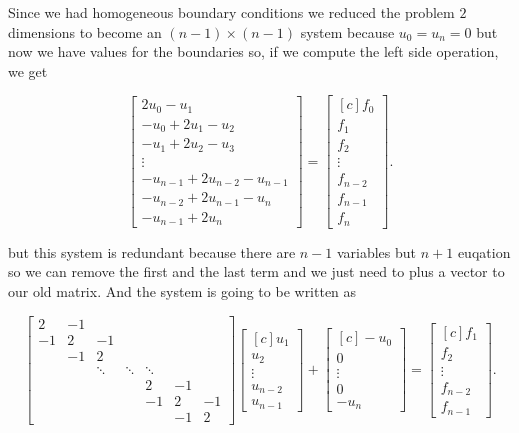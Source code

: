 \documentclass[fontsize=11pt,paper=a4,titlepage]{report}
\begin{document}
Since we had homogeneous boundary conditions we reduced the problem $2$ 
dimensions to become an $(n - 1) \times (n - 1)$ system because $u_0 = u_n = 0$ 
but now we have values for the boundaries so, if we compute the left side 
operation, we get

\begin{displaymath}
\begin{bmatrix}
	2u_0 - u_1 \\
	- u_0 + 2u_1 - u_2 \\
	- u_1 + 2u_2 - u_3 \\
	\vdots \\
	- u_{n - 1} + 2u_{n - 2} - u_{n - 1} \\
	- u_{n - 2} + 2u_{n - 1} - u_{n} \\
	- u_{n - 1} + 2u_n
\end{bmatrix}
=
\begin{bmatrix*}[c]
	f_0 \\
	f_1 \\
	f_2 \\
	\vdots \\
	f_{n - 2} \\
	f_{n - 1} \\
	f_n
\end{bmatrix*}.
\end{displaymath}

but this system is redundant because there are $n - 1$ variables but $n + 1$ 
euqation so we can remove the first and the last term and we just need to plus a
vector to our old matrix. And the system is going to be written as

\begin{displaymath}
\begin{bmatrix}
	2 & -1 &  &  &  &  &  \\
	-1 & 2 & -1 &  &  &  &  \\
	 & -1 & 2 &  &  &  &  \\
	 &  & \ddots & \ddots & \ddots &  & \\
	 &  &  &  & 2 & -1 &  \\
	 &  &  &  & -1 & 2 & -1 \\
	 &  &  &  &  & -1 & 2
\end{bmatrix}
\begin{bmatrix*}[c]
	u_1 \\
	u_2 \\
	\vdots \\
	u_{n - 2} \\
	u_{n - 1}
\end{bmatrix*}
+ \begin{bmatrix*}[c]
	- u_0 \\
	0 \\
	\vdots \\
	0 \\
	- u_n
\end{bmatrix*}
=
\begin{bmatrix*}[c]
	f_1 \\
	f_2 \\
	\vdots \\
	f_{n - 2} \\
	f_{n - 1}
\end{bmatrix*}.
\end{displaymath}
\end{document}
